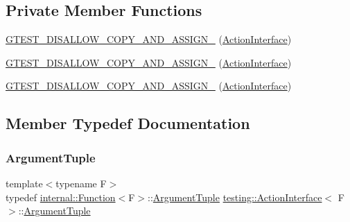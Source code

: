 \subsection*{Private Member Functions}
\begin{DoxyCompactItemize}
\item 
\mbox{\hyperlink{classtesting_1_1_action_interface_aea0e7557e7f56ee0f29bd7680846c6aa}{G\+T\+E\+S\+T\+\_\+\+D\+I\+S\+A\+L\+L\+O\+W\+\_\+\+C\+O\+P\+Y\+\_\+\+A\+N\+D\+\_\+\+A\+S\+S\+I\+G\+N\+\_\+}} (\mbox{\hyperlink{classtesting_1_1_action_interface}{Action\+Interface}})
\item 
\mbox{\hyperlink{classtesting_1_1_action_interface_aea0e7557e7f56ee0f29bd7680846c6aa}{G\+T\+E\+S\+T\+\_\+\+D\+I\+S\+A\+L\+L\+O\+W\+\_\+\+C\+O\+P\+Y\+\_\+\+A\+N\+D\+\_\+\+A\+S\+S\+I\+G\+N\+\_\+}} (\mbox{\hyperlink{classtesting_1_1_action_interface}{Action\+Interface}})
\item 
\mbox{\hyperlink{classtesting_1_1_action_interface_aea0e7557e7f56ee0f29bd7680846c6aa}{G\+T\+E\+S\+T\+\_\+\+D\+I\+S\+A\+L\+L\+O\+W\+\_\+\+C\+O\+P\+Y\+\_\+\+A\+N\+D\+\_\+\+A\+S\+S\+I\+G\+N\+\_\+}} (\mbox{\hyperlink{classtesting_1_1_action_interface}{Action\+Interface}})
\end{DoxyCompactItemize}


\subsection{Member Typedef Documentation}
\mbox{\label{classtesting_1_1_action_interface_af72720d864da4d606629e83edc003511}} 
\subsubsection{\texorpdfstring{ArgumentTuple}{ArgumentTuple}\hspace{0.1cm}{\footnotesize\ttfamily [1/3]}}
{\footnotesize\ttfamily template$<$typename F$>$ \\
typedef \mbox{\hyperlink{structtesting_1_1internal_1_1_function}{internal\+::\+Function}}$<$F$>$\+::\mbox{\hyperlink{classtesting_1_1_action_interface_af72720d864da4d606629e83edc003511}{Argument\+Tuple}} \mbox{\hyperlink{classtesting_1_1_action_interface}{testing\+::\+Action\+Interface}}$<$ F $>$\+::\mbox{\hyperlink{classtesting_1_1_action_interface_af72720d864da4d606629e83edc003511}{Argument\+Tuple}}}

